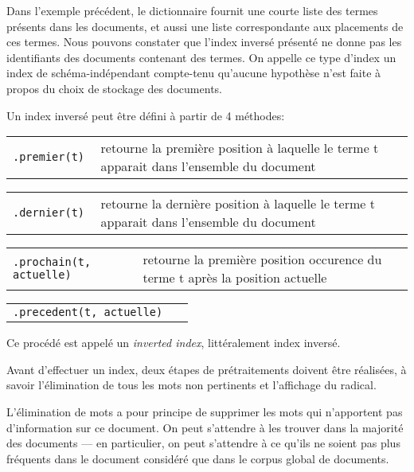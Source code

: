 Dans l'exemple précédent, le dictionnaire fournit une courte
liste des termes \linebreak présents dans les documents, et aussi une
liste correspondante aux placements de ces termes. Nous pouvons
constater que l'index inversé présenté ne donne pas les
identifiants des documents contenant des termes.
{\color{red} On appelle ce type d'index un index de
schéma-indépendant compte-tenu qu'aucune hypothèse
n'est faite à propos du choix de stockage des documents}.

Un index inversé peut être défini à partir de 4 méthodes:

\begin{addmargin}{.5cm}

\begin{tabular}{l p{11cm}}
\tt .premier(t) & retourne la première position à
                  laquelle le terme t apparait dans
                  l'ensemble du document
\end{tabular}

\begin{tabular}{l p{11cm}}
\tt .dernier(t) & retourne la dernière position à
                  laquelle le terme t apparait dans
                  l'ensemble du document
\end{tabular}

\begin{tabular}{l p{8.2cm}}
\tt .prochain(t, actuelle) & retourne la première position
                             occurence du terme t après la
                             position actuelle
\end{tabular}

\begin{tabular}{l p{8.1cm}}
\tt .precedent(t, actuelle) &
\end{tabular}

\end{addmargin}

Ce procédé est appelé un {\it inverted index},
littéralement index inversé.

Avant d'effectuer un index, deux étapes de prétraitements
doivent être réalisées, à savoir l'élimination de tous
les mots non pertinents et l'affichage du radical.

L'élimination de mots a pour principe de supprimer les mots
qui n'apportent pas d'information sur ce document.
On peut s'attendre à les trouver dans la majorité des documents
\---- en particulier, on peut s'attendre à ce qu'ils ne soient
pas plus fréquents dans le document considéré que dans le corpus
global de documents.

